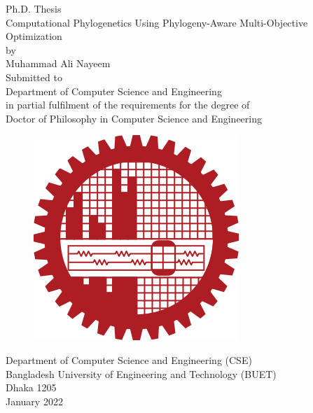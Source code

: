\begin{titlepage}
\centering 
 {\sc \Large Ph.D. Thesis} \\
 \vspace{1 cm}
 {\huge Computational Phylogenetics Using Phylogeny-Aware Multi-Objective Optimization}\\
 \vspace{0.5 cm}
 {\Large by \\
 Muhammad Ali Nayeem}\\
 \vspace{3cm}
 {\Large Submitted to}\\
 {\Large Department of Computer Science and Engineering\\
 in partial fulfilment of the requirements for the degree of \\
 Doctor of Philosophy in Computer Science and Engineering} \\
 \vspace{1cm}
 \begin{figure}[h] 
 \centering
 \includegraphics[scale=0.2]{Figure/buet_logo}
 \end{figure}
 \vspace{0.4cm}
 {\Large Department of Computer Science and Engineering (CSE)\\
 	Bangladesh University of Engineering and Technology (BUET)\\
 	Dhaka 1205 \\
 }
 \vspace{0.5cm}
 {\Large January 2022}
\end{titlepage}
 \newpage
 
